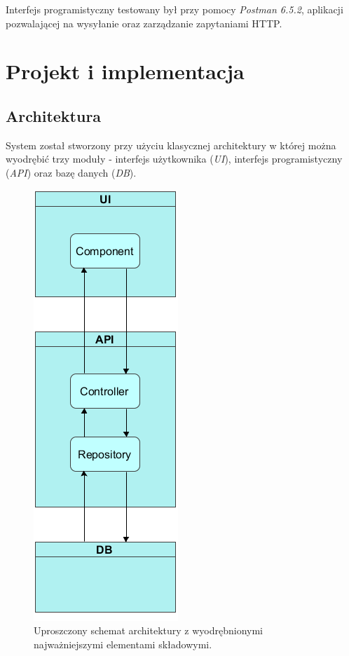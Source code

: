 \documentclass[eng,printmode,openany]{mgr}
\begin{document}
	Interfejs programistyczny testowany był przy pomocy \textit{Postman 6.5.2}, aplikacji pozwalającej na wysyłanie oraz zarządzanie zapytaniami HTTP.
	
	\newpage
	\chapter{Projekt i implementacja}
	\section{Architektura}
	System został stworzony przy użyciu klasycznej architektury w której można wyodrębić trzy moduły - interfejs użytkownika (\textit{UI}), interfejs programistyczny (\textit{API}) oraz bazę danych (\textit{DB}). 
	
	\begin{figure}[h]
		\centering
		\includegraphics[scale=0.6]{images/architecture.png}
		\caption{Uproszczony schemat architektury z wyodrębnionymi najważniejszymi elementami składowymi.}
	\end{figure}
	
\end{document}
